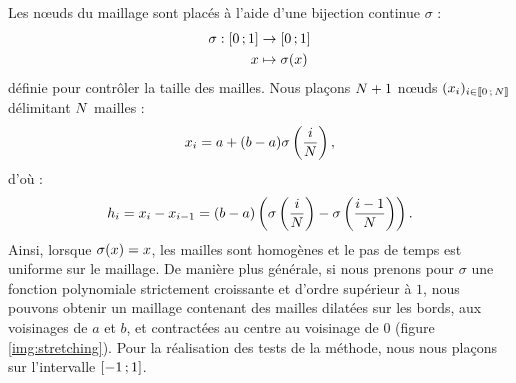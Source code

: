 Les nœuds du maillage sont placés à l'aide d'une bijection continue $\sigma$ :
\begin{equation}
	\begin{aligned}
		\sigma : \lbrack0\,;1\rbrack &\to \lbrack0\,;1\rbrack \\
		x &\mapsto \sigma(x)
	\end{aligned}
\end{equation}
définie pour contrôler la taille des mailles.
Nous plaçons $N + 1$ nœuds $(x_{i})_{i \in \lbrack\!\lbrack0\,;\,N\rbrack\!\rbrack}$
délimitant $N$ mailles :
\begin{align}
	x_{i} = a + (b - a) \sigma \left( \frac{i}{N} \right) ,
\end{align}
d'où :
\begin{align}
	h_i = x_{i} - x_{i - 1} =
	(b - a) \left( \sigma \left( \frac{i}{N} \right) 
		- \sigma \left( \frac{i-1}{N} \right) \right) .
\end{align}
Ainsi, lorsque $\sigma(x) = x$, les mailles sont homogènes
et le pas de temps est uniforme sur le maillage.
De manière plus générale, si nous prenons pour $\sigma$ une fonction polynomiale
strictement croissante et d'ordre supérieur à $1$,
nous pouvons obtenir un maillage contenant des mailles dilatées sur les
bords, aux voisinages de $a$ et $b$,
et contractées au centre au voisinage de $0$ (figure \ref{img:stretching}).
Pour la réalisation des tests de la méthode, nous nous plaçons
sur l'intervalle $\lbrack-1\,;1\rbrack$.


